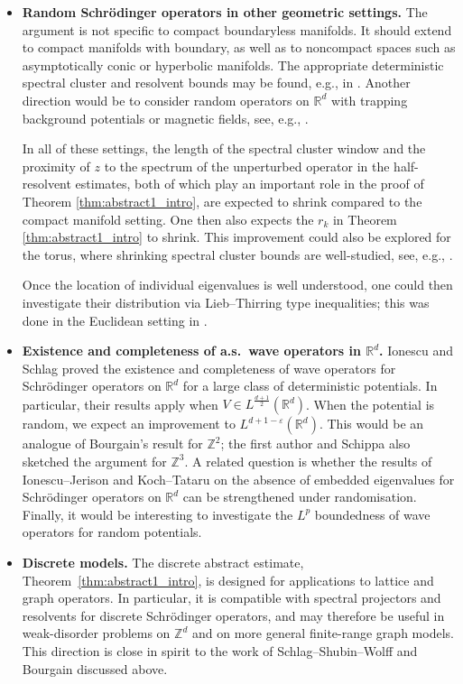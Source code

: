 \documentclass[12pt,reqno]{amsart}
\theoremstyle{definition}
\theoremstyle{remark}
\numberwithin{equation}{section}
\newcommand{\1}{\mathbbm{1}}
\renewcommand{\epsilon}{\varepsilon}
\newcommand{\R}{\mathbb{R}}
\newcommand{\Z}{\mathbb{Z}}
\begin{document}
\begin{itemize}
    \item[(i)] \textbf{Random Schr\"odinger operators in other geometric settings.}
    The argument is not specific to compact boundaryless manifolds. It should extend to compact manifolds with boundary, as well as to noncompact spaces such as asymptotically conic or hyperbolic manifolds. The appropriate deterministic spectral cluster and resolvent bounds may be found, e.g., in \cite{MR1257279,MR2316270,MR3805767,MR4150258}.
    Another direction would be to consider random operators on $\R^d$ with trapping background potentials or magnetic fields, see, e.g., \cite{MR2140267,MR2314091}. 
    
    In all of these settings, the length of the spectral cluster window and the proximity of $z$ to the spectrum of the unperturbed operator in the half-resolvent estimates, both of which play an important role in the proof of Theorem \ref{thm:abstract1_intro}, are expected to shrink compared to the compact manifold setting. One then also expects the $r_k$ in Theorem \ref{thm:abstract1_intro} to shrink. This improvement could also be explored for the torus, where shrinking spectral cluster bounds are well-studied, see, e.g., \cite{MR4422439,MR4818473}. 

    Once the location of individual eigenvalues is well understood, one could then investigate their distribution via Lieb--Thirring type inequalities; this was done in the Euclidean setting in \cite{CueninMerz2023}.  

    \item[(ii)] \textbf{Existence and completeness of a.s.\ wave operators in $\R^d$.} Ionescu and Schlag \cite{IonescuSchlag2006} proved the existence and completeness of wave operators for Schr\"odinger operators on $\R^d$ for a large class of deterministic potentials. In particular, their results apply when $V\in L^{\frac{d+1}{2}}(\R^d)$. When the potential is random, we expect an improvement to $L^{d+1-\epsilon}(\R^d)$. This would be an analogue of Bourgain's result \cite{Bourgain2003} for $\Z^2$;
    the first author and Schippa \cite{CueninSchippa2022} also sketched the argument for $\Z^3$. A related question is whether the results of Ionescu--Jerison \cite{IonescuJerison2003} and Koch--Tataru \cite{KochTataru2006} on the absence of embedded eigenvalues for Schr\"odinger operators on $\R^d$ can be strengthened under randomisation. Finally, it would be interesting to investigate the \(L^p\) boundedness of wave operators for random potentials.

    \item[(iii)] \textbf{Discrete models.}
    The discrete abstract estimate, Theorem~\ref{thm:abstract1_intro}, is designed for applications to lattice and graph operators. In particular, it is compatible with spectral projectors and resolvents for discrete Schr\"odinger operators, and may therefore be useful in weak-disorder problems on \(\mathbb Z^d\) and on more general finite-range graph models. This direction is close in spirit to the work of Schlag--Shubin--Wolff and Bourgain discussed above.
\end{itemize}
\end{document}

